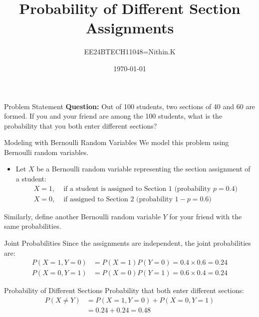 \documentclass{beamer}
\title{Probability of Different Section Assignments}
\author{EE24BTECH11048=Nithin.K}
\date{\today}
\begin{document}
\frame{\titlepage}

\begin{frame}{Problem Statement}
    \textbf{Question:}\newline
    Out of 100 students, two sections of 40 and 60 are formed. If you and your friend are among the 100 students, what is the probability that you both enter different sections?
\end{frame}

\begin{frame}{Modeling with Bernoulli Random Variables}
    We model this problem using Bernoulli random variables.
    \begin{itemize}
        \item Let $X$ be a Bernoulli random variable representing the section assignment of a student:
        \begin{align*}
            X = 1, & \text{ if a student is assigned to Section 1 (probability } p = 0.4) \\
            X = 0, & \text{ if assigned to Section 2 (probability } 1 - p = 0.6)
        \end{align*}
    \end{itemize}
    Similarly, define another Bernoulli random variable $Y$ for your friend with the same probabilities.
\end{frame}

\begin{frame}{Joint Probabilities}
    Since the assignments are independent, the joint probabilities are:
    \begin{align}
        P(X = 1, Y = 0) &= P(X = 1) P(Y = 0) = 0.4 \times 0.6 = 0.24 \\
        P(X = 0, Y = 1) &= P(X = 0) P(Y = 1) = 0.6 \times 0.4 = 0.24
    \end{align}
\end{frame}

\begin{frame}{Probability of Different Sections}
    Probability that both enter different sections:
    \begin{align}
        P(X \neq Y) &= P(X = 1, Y = 0) + P(X = 0, Y = 1) \\
        &= 0.24 + 0.24 = 0.48
    \end{align}
\end{frame}
\end{document}
